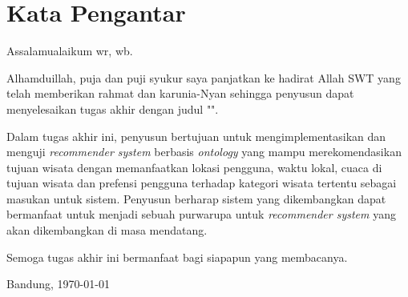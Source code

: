 \chapter*{Kata Pengantar}

\par
Assalamualaikum wr, wb.
\newline
\par
Alhamduillah, puja dan puji syukur saya panjatkan ke hadirat Allah SWT yang telah memberikan rahmat dan
karunia-Nyan sehingga penyusun dapat menyelesaikan tugas akhir dengan judul "\Title".
\par
Dalam tugas akhir ini, penyusun bertujuan untuk mengimplementasikan dan menguji \textit{recommender system}
berbasis \textit{ontology} yang mampu merekomendasikan tujuan wisata dengan memanfaatkan lokasi
pengguna, waktu lokal, cuaca di tujuan wisata dan prefensi pengguna terhadap kategori wisata tertentu
sebagai masukan untuk sistem. Penyusun berharap sistem yang dikembangkan dapat bermanfaat untuk menjadi
sebuah purwarupa untuk \textit{recommender system} yang akan dikembangkan di masa mendatang.
\par
Semoga tugas akhir ini bermanfaat bagi siapapun yang membacanya.

\vspace{2 cm}
\begin{flushright}
Bandung, \today
\\[2cm]
\Author
\end{flushright}